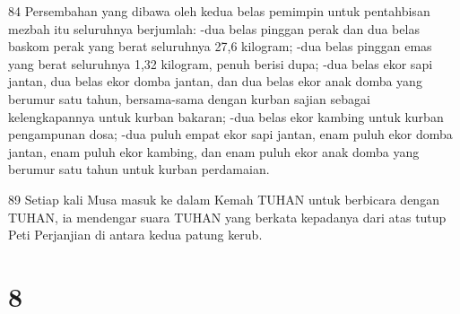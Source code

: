 \par 84 Persembahan yang dibawa oleh kedua belas pemimpin untuk pentahbisan mezbah itu seluruhnya berjumlah: -dua belas pinggan perak dan dua belas baskom perak yang berat seluruhnya 27,6 kilogram; -dua belas pinggan emas yang berat seluruhnya 1,32 kilogram, penuh berisi dupa; -dua belas ekor sapi jantan, dua belas ekor domba jantan, dan dua belas ekor anak domba yang berumur satu tahun, bersama-sama dengan kurban sajian sebagai kelengkapannya untuk kurban bakaran; -dua belas ekor kambing untuk kurban pengampunan dosa; -dua puluh empat ekor sapi jantan, enam puluh ekor domba jantan, enam puluh ekor kambing, dan enam puluh ekor anak domba yang berumur satu tahun untuk kurban perdamaian.
\par 89 Setiap kali Musa masuk ke dalam Kemah TUHAN untuk berbicara dengan TUHAN, ia mendengar suara TUHAN yang berkata kepadanya dari atas tutup Peti Perjanjian di antara kedua patung kerub.

\chapter{8}

